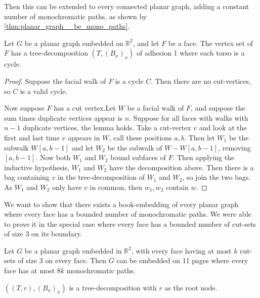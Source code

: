 Then this can be extended to every connected planar graph, adding a constant number of monochromatic paths, as shown by \cref{thm:planar_graph__be_mono_paths}.

\begin{lemma}\label{lemma:decomposition_faces}
	Let $G$ be a planar graph embedded on $\mathbb{R}^2$, and let $F$ be a face. The vertex set of $F$ has a tree-decomposition $(T, (B_x)_x)$ of adhesion 1 where each torso is a cycle.
\end{lemma}

\begin{proof}
	Suppose the facial walk of $F$ is a cycle $C$. Then there are no cut-vertices, so $C$ is a valid cycle.

	Now suppose $F$ has a cut vertex.Let $W$ be a facial walk of $F$, and suppose the sum times duplicate vertices appear is $n$. Suppose for all faces with walks with $n-1$ duplicate vertices, the lemma holds. Take a cut-vertex $v$ and look at the first and last time $v$ appears in $W$, call these positions $a, b$. Then let $W_1$ be the subwalk $W[a, b-1]$ and let $W_2$ be the subwalk of $W - W[a, b-1]$, removing $[a, b-1]$. Now both $W_1$ and $W_2$ bound subfaces of $F$. Then applying the inductive hypothesis, $W_1$ and $W_2$ have the decomposition above. Then there is a bag containing $v$ in the tree-decomposition of $W_1$ and $W_2$, so join the two bags. As $W_1$ and $W_2$ only have $v$ in common, then $w_1, w_2$ contain $w$. 
\end{proof}

We want to show that there exists a book-embedding of every planar graph where every face has a bounded number of monochromatic paths. We were able to prove it in the special case where every face has a bounded number of cut-sets of size 3 on its boundary.

\begin{theorem}\label{thm:planar_graph__be_mono_paths}
	Let \( G \) be a planar graph embedded in $\mathbb{R}^2$, with every face having at most $k$ cut-sets of size $3$ on every face. Then $G$ can be embedded on 11 pages where every face has at most $8k$ monochromatic paths. 
\end{theorem}

$ ((T,r), (B_x)_x)$ is a tree-decomposition with $r$ as the root node. 

